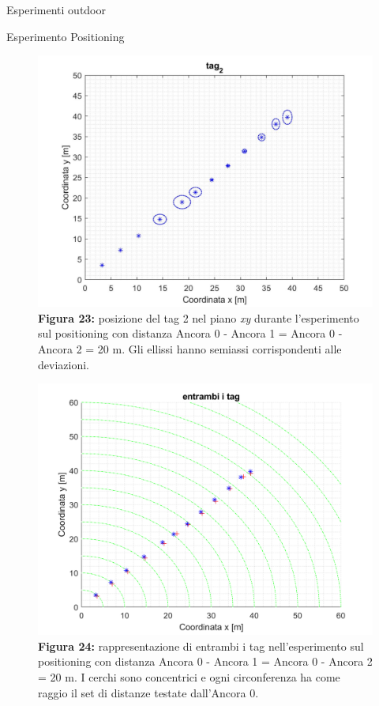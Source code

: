 \documentclass[12pt]{report}
\begin{document}
\begin{section}{Esperimenti outdoor}
\begin{subsection}{Esperimento Positioning}
			\begin{figure}[H]
				\centering
				\includegraphics[scale=0.3]{EspOutPos20_2}
	 			\caption{\textbf{Figura 23:} posizione del tag 2 nel piano \textit{xy} durante l'esperimento sul positioning con distanza Ancora 0 - Ancora 1 = Ancora 0 - Ancora 2 = 20 m. Gli ellissi hanno semiassi corrispondenti alle deviazioni.\label{EspOutPos20_2}}
			\end{figure}

			\begin{figure}[H]
				\centering
				\includegraphics[scale=0.45]{EspOutPos20}
	 			\caption{\textbf{Figura 24:} rappresentazione di entrambi i tag nell'esperimento sul positioning con distanza Ancora 0 - Ancora 1 = Ancora 0 - Ancora 2 = 20 m. I cerchi sono concentrici e ogni circonferenza ha come raggio il set di distanze testate dall'Ancora 0.\label{EspOutPos20}}
			\end{figure}


\end{subsection}
\end{section}
\end{document}
